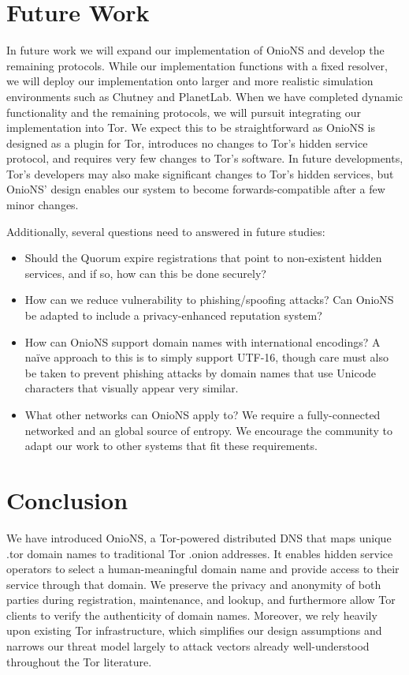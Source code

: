 \documentclass{sig-alternate}
\begin{document}
\section{Future Work}

In future work we will expand our implementation of OnioNS and develop the remaining protocols. While our implementation functions with a fixed resolver, we will deploy our implementation onto larger and more realistic simulation environments such as Chutney and PlanetLab. When we have completed dynamic functionality and the remaining protocols, we will pursuit integrating our implementation into Tor. We expect this to be straightforward as OnioNS is designed as a plugin for Tor, introduces no changes to Tor's hidden service protocol, and requires very few changes to Tor's software. In future developments, Tor's developers may also make significant changes to Tor's hidden services, but OnioNS' design enables our system to become forwards-compatible after a few minor changes.

Additionally, several questions need to answered in future studies:

\begin{itemize}
	\item Should the Quorum expire registrations that point to non-existent hidden services, and if so, how can this be done securely?
	\item How can we reduce vulnerability to phishing/spoofing attacks? Can OnioNS be adapted to include a privacy-enhanced reputation system?
	\item How can OnioNS support domain names with international encodings? A na\"{i}ve approach to this is to simply support UTF-16, though care must also be taken to prevent phishing attacks by domain names that use Unicode characters that visually appear very similar.
	\item What other networks can OnioNS apply to? We require a fully-connected networked and an global source of entropy. We encourage the community to adapt our work to other systems that fit these requirements.
\end{itemize}

\section{Conclusion}

We have introduced OnioNS, a Tor-powered distributed DNS that maps unique .tor domain names to traditional Tor .onion addresses. It enables hidden service operators to select a human-meaningful domain name and provide access to their service through that domain. We preserve the privacy and anonymity of both parties during registration, maintenance, and lookup, and furthermore allow Tor clients to verify the authenticity of domain names. Moreover, we rely heavily upon existing Tor infrastructure, which simplifies our design assumptions and narrows our threat model largely to attack vectors already well-understood throughout the Tor literature.
\end{document}
